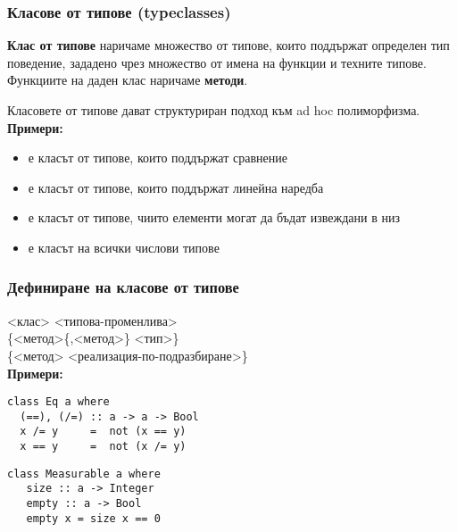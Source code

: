 \documentclass[alsotrans]{beamerswitch}
\begin{document}
\begin{frame}
  \frametitle{Класове от типове (typeclasses)}

  \begin{definition}
    \textbf{Клас от типове} наричаме множество от типове, които поддържат определен тип поведение, зададено чрез множество от имена на функции и техните типове. \pause Функциите на даден клас наричаме \textbf{методи}.
  \end{definition}
  \pause
  Класовете от типове дават структуриран подход към ad hoc полиморфизма.\\
  \pause
  \textbf{Примери:}
  \begin{itemize}[<+->]
  \item {} е класът от типове, които поддържат сравнение
  \item {} е класът от типове, които поддържат линейна наредба
  \item {} е класът от типове, чиито елементи могат да бъдат
    извеждани в низ
  \item {} е класът на всички числови типове
  \end{itemize}
\end{frame}

\begin{frame}[fragile]
  \frametitle{Дефиниране на класове от типове}
   <клас> <типова-променлива>\\
  \hspace{1em}\{<метод>\{,<метод>\} \tta{::} <тип>\}\\
  \hspace{1em}\{<метод> \tta{=} <реализация-по-подразбиране>\}\\[4ex]
  \pause
  \textbf{Примери:}\\
\begin{lstlisting}
class Eq a where
  (==), (/=) :: a -> a -> Bool
  x /= y     =  not (x == y)
  x == y     =  not (x /= y)
\end{lstlisting}
\pause
\begin{lstlisting}
class Measurable a where
   size :: a -> Integer
   empty :: a -> Bool
   empty x = size x == 0
\end{lstlisting}
\end{frame}
\end{document}
